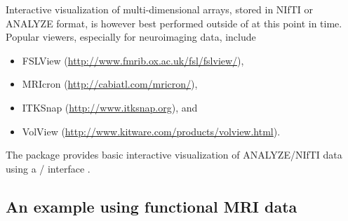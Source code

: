 \documentclass[
]{article}
\begin{document}
Interactive visualization of multi-dimensional arrays, stored in NIfTI
or ANALYZE format, is however best performed outside of  at
this point in time. Popular viewers, especially for neuroimaging data,
include

\begin{itemize}
\item FSLView (\url{http://www.fmrib.ox.ac.uk/fsl/fslview/}),
\item MRIcron (\url{http://cabiatl.com/mricron/}), 
\item ITKSnap (\url{http://www.itksnap.org}), and
\item VolView (\url{http://www.kitware.com/products/volview.html}).
\end{itemize}

The  package provides basic interactive visualization of
ANALYZE/NIfTI data using a / interface
\citep{mritc}.

\subsection{An example using functional MRI data}
\label{fmri_example}
\end{document}
